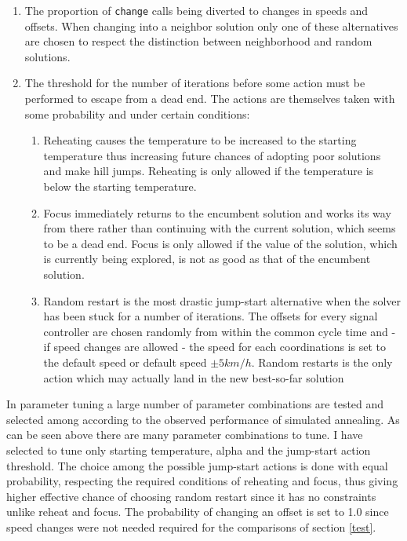 \begin{enumerate}
\item The proportion of \verb|change| calls being diverted to changes in speeds and offsets. When changing into a neighbor solution only one of these alternatives are chosen to respect the distinction between neighborhood and random solutions.
\item The threshold for the number of iterations before some action must be performed to escape from a dead end. The actions are themselves taken with some probability and under certain conditions:
\begin{enumerate}
\item Reheating causes the temperature to be increased to the starting temperature thus increasing future chances of adopting poor solutions and make hill jumps. Reheating is only allowed if the temperature is below the starting temperature.
\item Focus immediately returns to the encumbent solution and works its way from there rather than continuing with the current solution, which seems to be a dead end. Focus is only allowed if the value of the solution, which is currently being explored, is not as good as that of the encumbent solution.
\item Random restart is the most drastic jump-start alternative when the solver has been stuck for a number of iterations. The offsets for every signal controller are chosen randomly from within the common cycle time and - if speed changes are allowed - the speed for each coordinations is set to the default speed or default speed $\pm 5km/h$. Random restarts is the only action which may actually land in the new best-so-far solution
\end{enumerate}
\end{enumerate}

In parameter tuning a large number of parameter combinations are tested and selected among according to the observed performance of simulated annealing. As can be seen above there are many parameter combinations to tune. I have selected to tune only starting temperature, alpha and the jump-start action threshold. The choice among the possible jump-start actions is done with equal probability, respecting the required conditions of reheating and focus, thus giving higher effective chance of choosing random restart since it has no constraints unlike reheat and focus. The probability of changing an offset is set to 1.0 since speed changes were not needed required for the comparisons of section \ref{test}.

